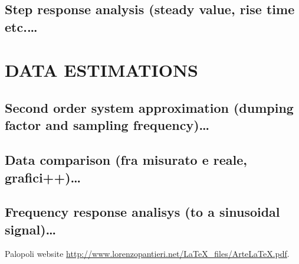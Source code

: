 \documentclass[a4paper,10pt]{book}
\begin{document}
\section{Step response analysis (steady value, rise time etc.\dots}

\chapter{DATA ESTIMATIONS}
\section{Second order system approximation (dumping factor and sampling frequency)\dots}
\section{Data comparison (fra misurato e reale, grafici++)\dots}
\section{Frequency response analisys (to a sinusoidal signal)\dots}


\begin{thebibliography}{9}

Palopoli website \url{http://www.lorenzopantieri.net/LaTeX_files/ArteLaTeX.pdf}.
\end{thebibliography}
\end{document}
